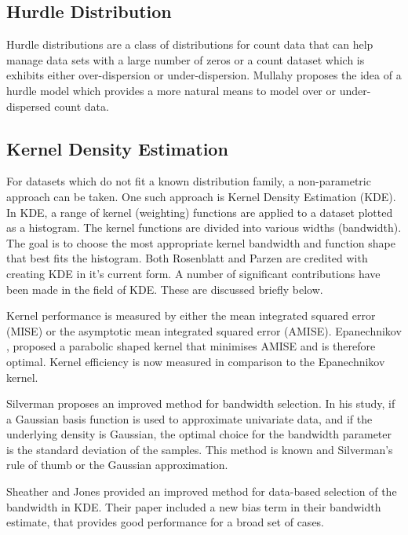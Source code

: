 \documentclass[conference]{IEEEtran}
\begin{document}
\subsection{Hurdle Distribution}

Hurdle distributions are a class of distributions for count data that can help manage data sets with a large number of zeros or a count dataset which is exhibits either over-dispersion or under-dispersion. Mullahy\cite{mullahy1986specification} proposes the idea of a hurdle model which provides a more natural means to model over or under-dispersed count data. 

\subsection{Kernel Density Estimation}

For datasets which do not fit a known distribution family, a non-parametric approach can be taken. One such approach is Kernel Density Estimation (KDE). In KDE, a range of kernel (weighting) functions are applied to a dataset plotted as a histogram. The kernel functions are divided into various widths (bandwidth). The goal is to choose the most appropriate kernel bandwidth and function shape that best fits the histogram. Both Rosenblatt\cite{rosenblatt1956remarks} and Parzen\cite{parzen1962estimation} are credited with creating KDE in it's current form. A number of significant contributions have been made in the field of KDE. These are discussed briefly below. \par

Kernel performance is measured by either the mean integrated squared error (MISE) or the asymptotic mean integrated squared error (AMISE). Epanechnikov \cite{epanechnikov1969non}, proposed a parabolic shaped kernel that minimises AMISE and is therefore optimal. Kernel efficiency is now measured in comparison to the Epanechnikov kernel.

Silverman \cite{silverman1986density} proposes an improved method for bandwidth selection. In his study, if a Gaussian basis function is used to approximate univariate data, and if the underlying density is Gaussian, the optimal choice for the bandwidth parameter is the standard deviation of the samples. This method is known and Silverman's rule of thumb or the Gaussian approximation. 

Sheather and Jones\cite{sheather1991reliable} provided an improved method for data-based selection of the bandwidth in KDE. Their paper included a new bias term in their bandwidth estimate, that provides good performance for a broad set of cases.
\end{document}
